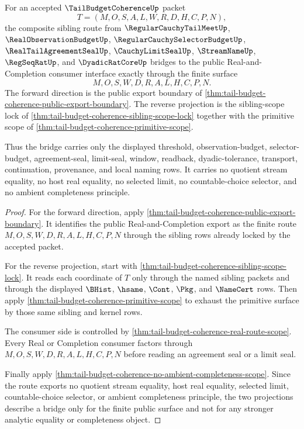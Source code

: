 \begin{theorem}
\label{thm:tail-budget-coherence-bridge-interface}
For an accepted $\TailBudgetCoherenceUp$ packet
$$
T=(M,O,S,A,L,W,R,D,H,C,P,N),
$$
the composite sibling route from $\RegularCauchyTailMeetUp$, $\RealObservationBudgetUp$, $\RegularCauchySelectorBudgetUp$, $\RealTailAgreementSealUp$, $\CauchyLimitSealUp$, $\StreamNameUp$, $\RegSeqRatUp$, and $\DyadicRatCoreUp$ bridges to the public Real-and-Completion consumer interface exactly through the finite surface
$$
M,O,S,W,D,R,A,L,H,C,P,N.
$$
The forward direction is the public export boundary of \autoref{thm:tail-budget-coherence-public-export-boundary}. The reverse projection is the sibling-scope lock of \autoref{thm:tail-budget-coherence-sibling-scope-lock} together with the primitive scope of \autoref{thm:tail-budget-coherence-primitive-scope}.

Thus the bridge carries only the displayed threshold, observation-budget, selector-budget, agreement-seal, limit-seal, window, readback, dyadic-tolerance, transport, continuation, provenance, and local naming rows. It carries no quotient stream equality, no host real equality, no selected limit, no countable-choice selector, and no ambient completeness principle.
\end{theorem}
\begin{proof}
For the forward direction, apply \autoref{thm:tail-budget-coherence-public-export-boundary}. It identifies the public Real-and-Completion export as the finite route $M,O,S,W,D,R,A,L,H,C,P,N$ through the sibling rows already locked by the accepted packet.

For the reverse projection, start with \autoref{thm:tail-budget-coherence-sibling-scope-lock}. It reads each coordinate of $T$ only through the named sibling packets and through the displayed $\BHist$, $\hsame$, $\Cont$, $\Pkg$, and $\NameCert$ rows. Then apply \autoref{thm:tail-budget-coherence-primitive-scope} to exhaust the primitive surface by those same sibling and kernel rows.

The consumer side is controlled by \autoref{thm:tail-budget-coherence-real-route-scope}. Every Real or Completion consumer factors through $M,O,S,W,D,R,A,L,H,C,P,N$ before reading an agreement seal or a limit seal.

Finally apply \autoref{thm:tail-budget-coherence-no-ambient-completeness-scope}. Since the route exports no quotient stream equality, host real equality, selected limit, countable-choice selector, or ambient completeness principle, the two projections describe a bridge only for the finite public surface and not for any stronger analytic equality or completeness object.
\end{proof}

